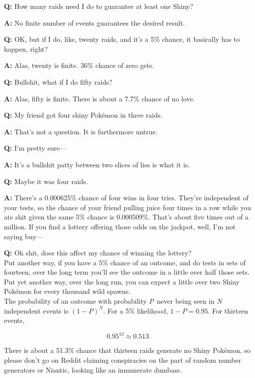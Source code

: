 \vfill
\begin{tipbox}[title=An aside regarding independent events,title style={color=Green!50!black}]
\textbf{Q:} How many raids need I do to guarantee at least one Shiny?

\textbf{A:} No finite number of events guarantees the desired result.

\textbf{Q:} OK, but if I do, like, twenty raids, and it's a 5\% chance, it basically has to happen, right?

\textbf{A:} Alas, twenty is finite. 36\% chance of zero gets.

\textbf{Q:} Bullshit, what if I do fifty raids?

\textbf{A:} Alas, fifty is finite. There is about a 7.7\% chance of no love.

\textbf{Q:} My friend got four shiny Pokémon in three raids.

\textbf{A:} That's not a question. It is furthermore untrue.

\textbf{Q:} I'm pretty sure---

\textbf{A:} It's a bullshit patty between two slices of lies is what it is.

\textbf{Q:} Maybe it was four raids.

\textbf{A:} There's a 0.000625\% chance of four wins in four tries. They're independent of your tests,
             so the chance of your friend pulling juice four times in a row while you ate shit given
             the same 5\% chance is 0.000509\%. That's about five times out of a million.
             If you find a lottery offering those odds on the jackpot, well, I'm not saying buy---

\textbf{Q:} Oh shit, does this affect my chance of winning the lottery?\\

Put another way, if you have a 5\% chance of an outcome, and do tests in sets of fourteen,
 over the long term you'll see the outcome in a little over half those sets.
Put yet another way, over the long run, you can expect a little over two Shiny
 Pokémon for every thousand wild spawns.\\

The probability of an outcome with probability $P$\, never being seen in $N$ independent
  events is ${(1 - P)}^N$. For a 5\% likelihood, $1 - P = 0.95$. For thirteen events,

  \[ 0.95^{13} ≈ 0.513 \]

There is about a 51.3\% chance that thirteen raids generate no Shiny Pokémon,
  so please don't go on Reddit claiming conspiracies on the part of
  random number generators or Niantic, looking like an innumerate dumbass.
\end{tipbox}
